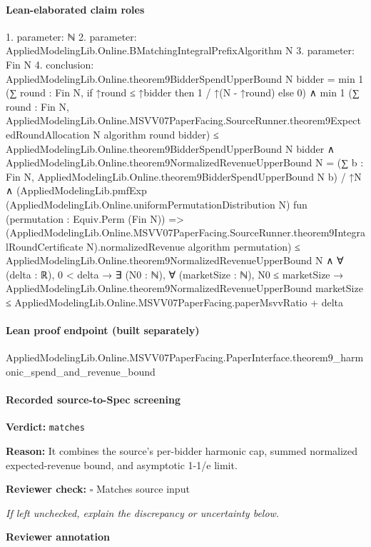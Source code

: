 \documentclass[10pt]{article}
\newcommand{\reviewerbox}{%
  \par\noindent\fbox{\parbox{0.96\linewidth}{\rule{0pt}{0.38in}}}\par
}
\newcommand{\reviewmatch}[1]{%
  \par\noindent\textbf{Reviewer check:} $\square$\; #1\par
  \noindent\emph{If left unchecked, explain the discrepancy or uncertainty below.}\par
}
\begin{document}
\paragraph{Lean-elaborated claim roles}\begin{ReviewVerbatim}
1. parameter: ℕ
2. parameter: AppliedModelingLib.Online.BMatchingIntegralPrefixAlgorithm N
3. parameter: Fin N
4. conclusion: AppliedModelingLib.Online.theorem9BidderSpendUpperBound N bidder =
    min 1 (∑ round : Fin N, if ↑round ≤ ↑bidder then 1 / ↑(N - ↑round) else 0) ∧
  min 1
        (∑ round : Fin N,
          AppliedModelingLib.Online.MSVV07PaperFacing.SourceRunner.theorem9ExpectedRoundAllocation N algorithm round
            bidder) ≤
      AppliedModelingLib.Online.theorem9BidderSpendUpperBound N bidder ∧
    AppliedModelingLib.Online.theorem9NormalizedRevenueUpperBound N =
        (∑ b : Fin N, AppliedModelingLib.Online.theorem9BidderSpendUpperBound N b) / ↑N ∧
      (AppliedModelingLib.pmfExp (AppliedModelingLib.Online.uniformPermutationDistribution N)
            fun (permutation : Equiv.Perm (Fin N)) =>
            (AppliedModelingLib.Online.MSVV07PaperFacing.SourceRunner.theorem9IntegralRoundCertificate
                  N).normalizedRevenue
              algorithm permutation) ≤
          AppliedModelingLib.Online.theorem9NormalizedRevenueUpperBound N ∧
        ∀ (delta : ℝ),
          0 < delta →
            ∃ (N0 : ℕ),
              ∀ (marketSize : ℕ),
                N0 ≤ marketSize →
                  AppliedModelingLib.Online.theorem9NormalizedRevenueUpperBound marketSize ≤
                    AppliedModelingLib.Online.MSVV07PaperFacing.paperMsvvRatio + delta
\end{ReviewVerbatim}

\paragraph{Lean proof endpoint (built separately)}\begin{ReviewVerbatim}
AppliedModelingLib.Online.MSVV07PaperFacing.PaperInterface.theorem9_harmonic_spend_and_revenue_bound
\end{ReviewVerbatim}

\paragraph{Recorded source-to-Spec screening}
\textbf{Verdict:} \texttt{matches}
\\
{\raggedright
\textbf{Reason:} It combines the source's per-\allowbreak{}bidder harmonic cap, summed normalized expected-\allowbreak{}revenue bound, and asymptotic 1-\allowbreak{}1/\allowbreak{}e limit.\allowbreak{}
\par}
\reviewmatch{Matches source input}
\noindent\textbf{Reviewer annotation}\par
\reviewerbox
\clearpage
\hypertarget{source-claim-5b5b88f1e98a5b03}{}
\end{document}
